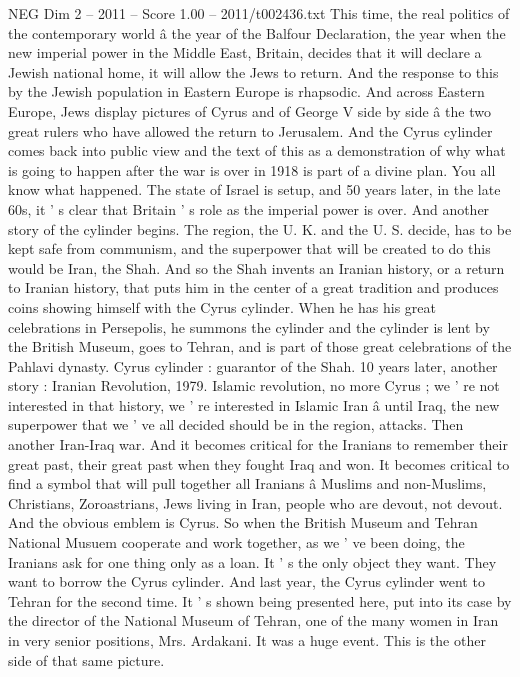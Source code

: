 \begin{textsample}{NEG Dim 2 – 2011 – Score 1.00 – 2011/t002436.txt}
This time, the real politics of the contemporary world â the year of the Balfour Declaration, the year when the new imperial power in the Middle East, Britain, decides that it will declare a Jewish national home, it will allow the Jews to return.
And the response to this by the Jewish population in Eastern Europe is rhapsodic.
And across Eastern Europe, Jews display pictures of Cyrus and of George V side by side â the two great rulers who have allowed the return to Jerusalem.
And the Cyrus cylinder comes back into public view and the text of this as a demonstration of why what is going to happen after the war is over in 1918 is part of a divine plan.
You all know what happened.
The state of Israel is setup, and 50 years later, in the late 60s, it ' s clear that Britain ' s role as the imperial power is over.
And another story of the cylinder begins.
The region, the U.
K. and the U.
S. decide, has to be kept safe from communism, and the superpower that will be created to do this would be Iran, the Shah.
And so the Shah invents an Iranian history, or a return to Iranian history, that puts him in the center of a great tradition and produces coins showing himself with the Cyrus cylinder.
When he has his great celebrations in Persepolis, he summons the cylinder and the cylinder is lent by the British Museum, goes to Tehran, and is part of those great celebrations of the Pahlavi dynasty.
Cyrus cylinder : guarantor of the Shah. 10 years later, another story : Iranian Revolution, 1979.
Islamic revolution, no more Cyrus ; we ' re not interested in that history, we ' re interested in Islamic Iran â until Iraq, the new superpower that we ' ve all decided should be in the region, attacks.
Then another Iran-Iraq war.
And it becomes critical for the Iranians to remember their great past, their great past when they fought Iraq and won.
It becomes critical to find a symbol that will pull together all Iranians â Muslims and non-Muslims, Christians, Zoroastrians, Jews living in Iran, people who are devout, not devout.
And the obvious emblem is Cyrus.
So when the British Museum and Tehran National Musuem cooperate and work together, as we ' ve been doing, the Iranians ask for one thing only as a loan.
It ' s the only object they want.
They want to borrow the Cyrus cylinder.
And last year, the Cyrus cylinder went to Tehran for the second time.
It ' s shown being presented here, put into its case by the director of the National Museum of Tehran, one of the many women in Iran in very senior positions, Mrs.
Ardakani.
It was a huge event.
This is the other side of that same picture.

\end{textsample}
